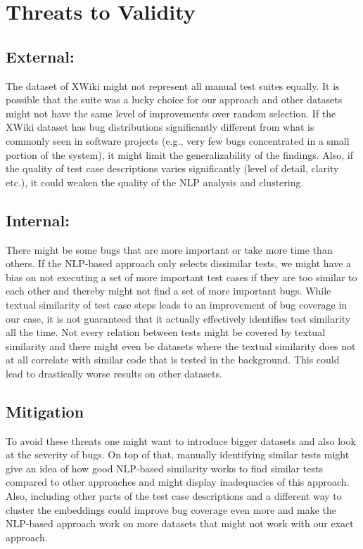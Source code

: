 \section{Threats to Validity}

\subsection*{External:} 
The dataset of XWiki might not represent all manual test suites equally. It is possible that the suite was a lucky choice for our approach and other datasets might not have the same level of improvements over random selection. If the XWiki dataset has bug distributions significantly different from what is commonly seen in software projects (e.g., very few bugs concentrated in a small portion of the system), it might limit the generalizability of the findings.
Also, if the quality of test case descriptions varies significantly (level of detail, clarity etc.), it could weaken the quality of the NLP analysis and clustering.


\subsection*{Internal:} 
There might be some bugs that are more important or take more time than others. If the \ac{NLP}-based approach only selects dissimilar tests, we might have a bias on not executing a set of more important test cases if they are too similar to each other and thereby might not find a set of more important bugs.
While textual similarity of test case steps leads to an improvement of bug coverage in our case, it is not guaranteed that it actually effectively identifies test similarity all the time. Not every relation between tests might be covered by textual similarity and there might even be datasets where the textual similarity does not at all correlate with similar code that is tested in the background. This could lead to drastically worse results on other datasets.

\subsection*{Mitigation}
To avoid these threats one might want to introduce bigger datasets and also look at the severity of bugs. On top of that, manually identifying similar tests might give an idea of how good \ac{NLP}-based similarity works to find similar tests compared to other approaches and might display inadequacies of this approach.
Also, including other parts of the test case descriptions and a different way to cluster the embeddings could improve bug coverage even more and make the \ac{NLP}-based approach work on more datasets that might not work with our exact approach.
